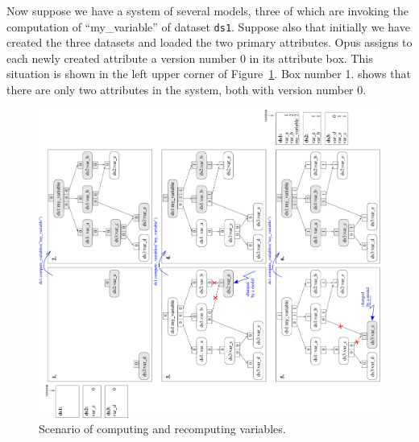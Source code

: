 {Now suppose we have a system of several models, three of which are invoking
the computation of ``my_variable'' \variablesindex of dataset \datasetindex \verb|ds1|. Suppose also that
initially we have created the three datasets \datasetindex and loaded the two primary
attributes. \primaryattributesindex Opus assigns to each newly created attribute \attributesindex a version number 0 in
its attribute \attributesindex box.  This situation is shown in the left upper corner of
Figure~\ref{fig:opus-core-variable-tree-1}. Box number 1. shows that there are only
two attributes \attributesindex in the system, both with version number 0.

\begin{figure}
\begin{center}
\includegraphics[scale=0.55, angle=-90]{images/variabletree1.pdf}
\caption{\label{fig:opus-core-variable-tree-1}\small Scenario of computing and
  recomputing variables.}

\end{center}
\end{figure}}
